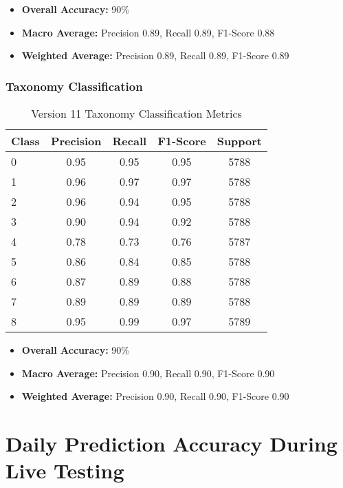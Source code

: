 \begin{itemize}
    \item \textbf{Overall Accuracy:} 90\%
    \item \textbf{Macro Average:} Precision 0.89, Recall 0.89, F1-Score 0.88
    \item \textbf{Weighted Average:} Precision 0.89, Recall 0.89, F1-Score 0.89
\end{itemize}

\subsection*{Taxonomy Classification}

\begin{table}[h!]
    \centering
    \caption{Version 11 Taxonomy Classification Metrics}
    \label{tab:v11_taxonomy_metrics}
    \begin{tabular}{|l|c|c|c|c|}
    \hline
    \textbf{Class} & \textbf{Precision} & \textbf{Recall} & \textbf{F1-Score} & \textbf{Support} \\
    \hline
    0 & 0.95 & 0.95 & 0.95 & 5788 \\
    \hline
    1 & 0.96 & 0.97 & 0.97 & 5788 \\
    \hline
    2 & 0.96 & 0.94 & 0.95 & 5788 \\
    \hline
    3 & 0.90 & 0.94 & 0.92 & 5788 \\
    \hline
    4 & 0.78 & 0.73 & 0.76 & 5787 \\
    \hline
    5 & 0.86 & 0.84 & 0.85 & 5788 \\
    \hline
    6 & 0.87 & 0.89 & 0.88 & 5788 \\
    \hline
    7 & 0.89 & 0.89 & 0.89 & 5788 \\
    \hline
    8 & 0.95 & 0.99 & 0.97 & 5789 \\
    \hline
    \end{tabular}
\end{table}

\begin{itemize}
    \item \textbf{Overall Accuracy:} 90\%
    \item \textbf{Macro Average:} Precision 0.90, Recall 0.90, F1-Score 0.90
    \item \textbf{Weighted Average:} Precision 0.90, Recall 0.90, F1-Score 0.90
\end{itemize}

\chapter{Daily Prediction Accuracy During Live Testing}
\label{AppendixB}

